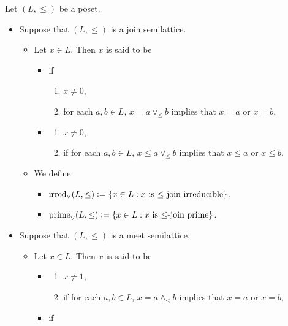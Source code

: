 \documentclass{book}
\begin{document}
	\begin{defn}
		Let $(L, \leq)$ be a poset.
		\begin{itemize}
			\item Suppose that $(L, \leq)$ is a join semilattice.
			\begin{itemize}
				\item Let $x \in L$. Then $x$ is said to be
				\begin{itemize}
					\item {} if 
					\begin{enumerate}
						\item $x \neq 0$,
						\item for each $a,b \in L$, $x = a \vee_{\leq} b$ implies that $x = a$ or $x = b$,
					\end{enumerate}
					\item {}
					\begin{enumerate}
						\item $x \neq 0$,
						\item if for each $a,b \in L$, $x \leq a \vee_{\leq} b$ implies that $x \leq a$ or $x \leq b$.
					\end{enumerate}
				\end{itemize}
				\item We define 
				\begin{itemize}
					\item $\operatorname*{\text{irred}_{\vee}}(L, \leq) \vcentcolon= \{x \in L: \text{$x$ is $\leq$-join irreducible}\}$,
					\item $\operatorname*{\text{prime}_{\vee}}(L, \leq) \vcentcolon= \{x \in L: \text{$x$ is $\leq$-join prime}\}$.
				\end{itemize}
			\end{itemize}
			\item Suppose that $(L, \leq)$ is a meet semilattice. 
			\begin{itemize}
				\item Let $x \in L$. Then $x$ is said to be 
				\begin{itemize}
					\item {} 
					\begin{enumerate}
						\item $x \neq 1$,
						\item if for each $a,b \in L$, $x = a \wedge_{\leq} b$ implies that $x = a$ or $x = b$, 
					\end{enumerate}
					\item {} if
					\begin{enumerate}

\end{enumerate}
\end{itemize}
\end{itemize}
\end{itemize}
\end{defn}
\end{document}
